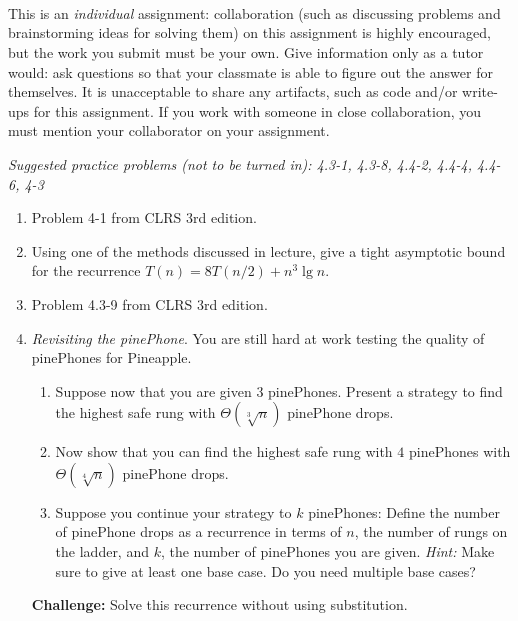 \documentclass[letterpaper,11pt]{article}
\begin{document}


 \\

 \\

 \\

This is an \emph{individual} assignment: collaboration (such as discussing problems and brainstorming ideas for solving them) on this assignment is highly encouraged, but the work you submit must be your own. Give information only as a tutor would: ask questions so that your classmate is able to figure out the answer for themselves. It is unacceptable to share any artifacts, such as code and/or write-ups for this assignment. If you work with someone in close collaboration, you must mention your collaborator on your assignment.

\emph{Suggested practice problems (not to be turned in): 4.3-1, 4.3-8, 4.4-2, 4.4-4, 4.4-6, 4-3}

\begin{enumerate}
\item Problem 4-1 from CLRS 3rd edition.
\item Using one of the methods discussed in lecture, give a tight asymptotic bound for the recurrence $T(n) = 8T(n/2) + n^3 \lg n$.
\item Problem 4.3-9 from CLRS 3rd edition.

\item \emph{Revisiting the pinePhone}. You are still hard at work testing the quality of pinePhones for Pineapple. 

\begin{enumerate}
\item Suppose now that you are given $3$ pinePhones. Present a strategy to find the highest safe rung with $\Theta(\sqrt[3]{n})$ pinePhone drops. 
\item Now show that you can find the highest safe rung with $4$ pinePhones with $\Theta(\sqrt[4]{n})$ pinePhone drops.
\item Suppose you continue your strategy to $k$ pinePhones: Define the number of pinePhone drops as a recurrence in terms of $n$, the number of rungs on the ladder, and $k$, the number of pinePhones you are given. \emph{Hint:} Make sure to give at least one base case. Do you need multiple base cases?
\end{enumerate}

{\bf Challenge:} Solve this recurrence without using substitution.


\end{enumerate}
\end{document}
